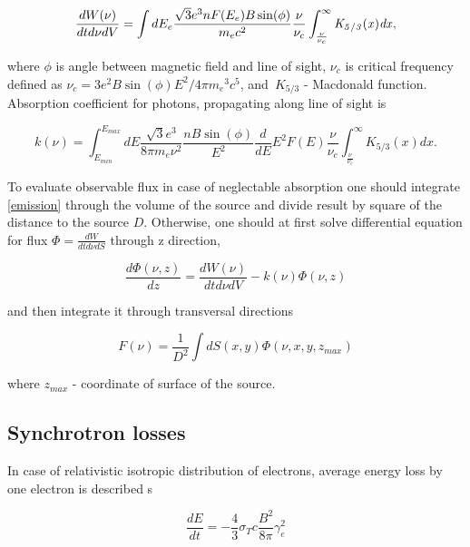 \begin{equation} \label{emission}
	\frac{dW(\nu)}{dt d\nu dV}=\int dE_e \frac {\sqrt {3}{e}^{3}n F(E_e) B \sin ( \phi)}{{m_e}{c}^{2}}
	\frac{\nu}{\nu_c}\int_{\frac {\nu}{\nu_c}}^{\infty }\it K_{5/3}(x)dx,
\end{equation}

where $\phi$ is angle between magnetic field and line of sight, $\displaystyle\nu_{c}$ is critical frequency defined as $\displaystyle\nu_{c} = 3 e^{2} B \sin(\phi) E^{2}/4\pi {m_{e}}^{3} c^{5}$, and~$K_{5/3}$ - Macdonald function.
Absorption coefficient for photons, propagating along line of sight is

\begin{equation}\label{absorption}
	k(\nu)=\int_{E_{min}}^{E_{max}}dE\frac {\sqrt {3}{e}^{3}}{8\pi m_e \nu^2}\frac{n B\sin(\phi)}{E^2}
	\frac{d}{dE} E^2 F(E)\frac {\nu}{ \nu_c}\int_{\frac {\nu}{ \nu_c}}^{\infty }K_{5/3}(x) dx.
\end{equation}

To evaluate observable flux in case of neglectable absorption one should integrate \ref{emission} through the volume of the source and divide result by square of the distance to the source $D$. Otherwise, one should at first solve differential equation for flux $\Phi=\frac{dW}{dt d\nu dS}$ through z direction,

\begin{equation}
\frac{d\Phi(\nu,z)}{dz} = \frac{dW(\nu)}{dt d\nu dV} - k(\nu)\Phi(\nu,z)
\end{equation}

and then integrate it through transversal directions

\begin{equation}
	F(\nu)=\frac{1}{D^2}\int dS(x,y) \Phi(\nu, x,y,z_{max})
\end{equation}

where $z_{max}$ - coordinate of surface of the source.

\subsection*{Synchrotron losses}

In case of relativistic isotropic distribution of electrons, average energy loss by one electron is described s

\begin{equation}
	\frac{dE}{dt} = -\frac{4}{3} \sigma_T c \frac{B^2}{8 \pi} \gamma_e^2
\end{equation}


